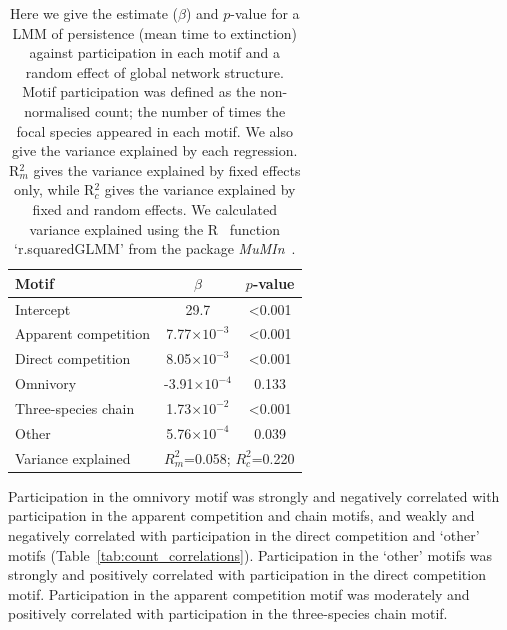 \documentclass[12pt]{article}
\begin{document}
\begin{spacing}{2.0}
		\begin{table}[hb!]
    		\caption{Here we give the estimate ($\beta$) and $p$-value for a LMM of persistence (mean time to extinction) against participation in each motif and a random effect of global network structure. Motif participation was defined as the non-normalised count; the number of times the focal species appeared in each motif. We also give the variance explained by each regression. R$^{2}_{m}$ gives the variance explained by fixed effects only, while R$^{2}_{c}$ gives the variance explained by fixed and random effects. We calculated variance explained using the R~\citep{R} function `r.squaredGLMM' from the package \emph{MuMIn}~\citep{MuMIn}.}
    		\label{tab:persistence_motifs}
    		\begin{tabular}{l | c c}
    		 Motif & $\beta$ & $p$-value \\  
    		 \hline
    		 Intercept & 29.7 & \textless0.001 \\
    		 \hline
    		 Apparent competition & 7.77$\times10^{-3}$ & \textless0.001 \\
    		 Direct competition & 8.05$\times10^{-3}$ & \textless0.001 \\
    		 Omnivory &  -3.91$\times10^{-4}$ & 0.133 \\
    		 Three-species chain &  1.73$\times10^{-2}$ & \textless0.001 \\
    		 Other &  5.76$\times10^{-4}$ & 0.039 \\
    		 \hline
    		 Variance explained & \multicolumn{2}{c}{$R^{2}_m$=0.058; $R^2_c$=0.220} \\
    		 \hline
    		 \end{tabular}
    		 \end{table}
    

		Participation in the omnivory motif was strongly and negatively correlated with participation in the apparent competition and chain motifs, and weakly and negatively correlated with participation in the direct competition and `other' motifs (Table~\ref{tab:count_correlations}).
		Participation in the `other' motifs was strongly and positively correlated with participation in the direct competition motif.
		Participation in the apparent competition motif was moderately and positively correlated with participation in the three-species chain motif.



\end{spacing}
\end{document}
